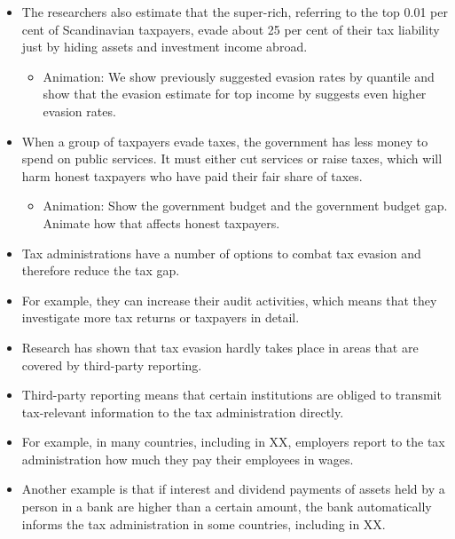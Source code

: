 \documentclass[11pt]{article}
\begin{document}
\begin{itemize}
\begin{itemize}
        \item Animation: We zoom in to the top decile of the income distribution and show that tax evasion is also highly unequally distributed at the top of the income distribution, with most of the evasion driven by the top 1\%.
        \item For that we can show evidence by \cite{alstadsaeter2019tax} where evasion rates are even higher than suggested in \cite{johns2010distribution}. 
    \end{itemize} 
\item The researchers also estimate that the super-rich, referring to the top 0.01 per cent of Scandinavian taxpayers, evade about 25 per cent of their tax liability just by hiding assets and investment income abroad. 
\begin{itemize}
    \item Animation: We show previously suggested evasion rates by quantile and show that the evasion estimate for top income by \cite{alstadsaeter2019tax} suggests even higher evasion rates. 
\end{itemize}
\item When a group of taxpayers evade taxes, the government has less money to spend on public services. It must either cut services or raise taxes, which will harm honest taxpayers who have paid their fair share of taxes. 
\begin{itemize}
    \item Animation: Show the government budget and the government budget gap. Animate how that affects honest taxpayers.
\end{itemize}
\item Tax administrations have a number of options to combat tax evasion and therefore reduce the tax gap.
\item For example, they can increase their audit activities, which means that they investigate more tax returns or taxpayers in detail.  
\item Research has shown that tax evasion hardly takes place in areas that are covered by third-party reporting.
\item Third-party reporting means that certain institutions are obliged to transmit tax-relevant information to the tax administration directly.
\item For example, in many countries, including in XX, employers report to the tax administration how much they pay their employees in wages.
\item Another example is that if interest and dividend payments of assets held by a person in a bank are higher than a certain amount, the bank automatically informs the tax administration in some countries, including in XX.

\end{itemize}
\end{document}
